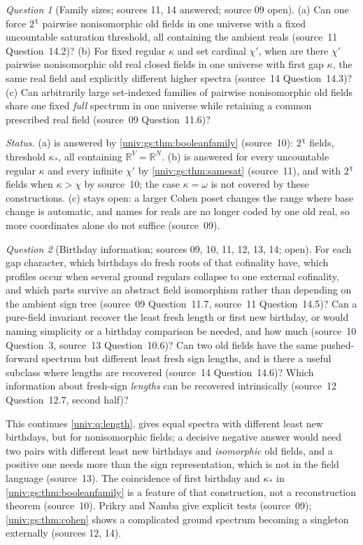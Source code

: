 \documentclass[11pt,letterpaper]{article}
\numberwithin{equation}{section}
\theoremstyle{definition}
\theoremstyle{remark}
\newtheorem{question}[question]{Question}
\newcommand{\R}{\mathbb R}
\begin{document}
\begin{question}[Family sizes; sources 11, 14 answered; source 09 open]\label{univ:gs:q:size}
(a) Can one force $2^\chi$ pairwise nonisomorphic old fields in one universe with a fixed
uncountable saturation threshold, all containing the ambient reals (source~11 Question~14.2)?
(b) For fixed regular $\kappa$ and set cardinal $\chi'$, when are there $\chi'$ pairwise
nonisomorphic old real closed fields in one universe with first gap $\kappa$, the same real field
and explicitly different higher spectra (source~14 Question~14.3)? (c) Can arbitrarily large
set-indexed families of pairwise nonisomorphic old fields share one fixed \emph{full} spectrum in
one universe while retaining a common prescribed real field (source~09 Question~11.6)?
\end{question}
\emph{Status.} (a) is answered by \cref{univ:gs:thm:booleanfamily} (source~10): $2^\chi$ fields,
threshold $\kappa_*$, all containing $\R^V=\R^N$. (b) is answered for every uncountable regular
$\kappa$ and every infinite $\chi'$ by \cref{univ:gs:thm:samesat} (source~11), and with $2^\chi$
fields when $\kappa>\chi$ by source~10; the case $\kappa=\omega$ is not covered by these
constructions.
(c) stays open: a larger Cohen poset changes the range
where base change is automatic, and names for reals are no longer coded by one old real, so more
coordinates alone do not suffice (source~09).

\begin{question}[Birthday information; sources 09, 10, 11, 12, 13, 14; open]\label{univ:gs:q:birthday}
For each gap character, which birthdays do fresh roots of that cofinality have, which profiles
occur when several ground regulars collapse to one external cofinality, and which parts survive an
abstract field isomorphism rather than depending on the ambient sign tree (source~09
Question~11.7, source~11 Question~14.5)? Can a pure-field invariant recover the least fresh
length or first new birthday, or would naming simplicity or a birthday comparison be needed, and
how much (source~10 Question~3, source~13 Question~10.6)? Can two old fields have the same
pushed-forward spectrum but different least fresh sign lengths, and is there a useful subclass
where lengths are recovered (source~14 Question~14.6)? Which information about fresh-sign
\emph{lengths} can be recovered intrinsically (source~12 Question~12.7, second half)?
\end{question}
This continues \cref{univ:q:length}.  gives equal spectra with
different least new birthdays, but for nonisomorphic fields; a decisive negative answer would need
two pairs with different least new birthdays and \emph{isomorphic} old fields, and a positive one
needs more than the sign representation, which is not in the field language (source~13). The
coincidence of first birthday and $\kappa_*$ in \cref{univ:gs:thm:booleanfamily} is a feature of
that construction, not a reconstruction theorem (source~10). Prikry and Namba give explicit tests
(source~09); \cref{univ:gs:thm:cohen} shows a complicated ground spectrum becoming a singleton
externally (sources 12, 14).
\end{document}

